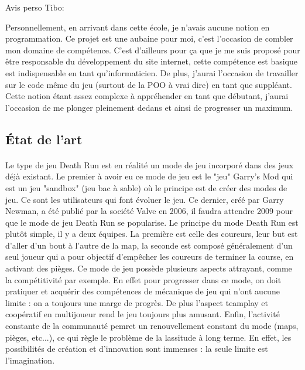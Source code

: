 \documentclass[12pt]{report}
\begin{document}
Avis perso Tibo:

Personnellement, en arrivant dans cette école, je n’avais aucune notion en programmation. Ce projet est une aubaine pour moi, c’est l’occasion de combler mon domaine de compétence. C’est d’ailleurs pour ça que je me suis proposé pour être responsable du développement du site internet, cette compétence est basique est indispensable en tant qu’informaticien. De plus, j’aurai l’occasion de travailler sur le code même du jeu (surtout de la POO à vrai dire) en tant que suppléant. Cette notion étant assez complexe à appréhender en tant que débutant, j’aurai l’occasion de me plonger pleinement dedans et ainsi de progresser un maximum. 

	\subsection{\'Etat de l'art}
	\paragraph{}
	Le type de jeu Death Run est en réalité un mode de jeu incorporé dans des jeux déjà existant. Le premier à avoir eu ce mode de jeu est le "jeu" Garry's Mod qui est un jeu "sandbox" (jeu bac à sable) où le principe est de créer des modes de jeu. Ce sont les utilisateurs qui font évoluer le jeu. Ce dernier, créé par Garry Newman, a été publié par la société Valve en 2006, il faudra attendre 2009 pour que le mode de jeu Death Run se popularise. Le principe du mode Death Run est plutôt simple, il y a deux équipes. La première est celle des coureurs, leur but est d'aller d'un bout à l'autre de la map, la seconde est composé généralement d'un seul joueur qui a pour objectif d'empêcher les coureurs de terminer la course, en activant des pièges. Ce mode de jeu possède plusieurs aspects attrayant, comme la compétitivité par exemple. En effet pour progresser dans ce mode, on doit pratiquer et acquérir des compétences de mécanique de jeu qui n'ont aucune limite : on a toujours une marge de progrès. De plus l'aspect teamplay et coopératif en multijoueur rend le jeu toujours plus amusant. Enfin, l'activité constante de la communauté pemret un renouvellement constant du mode (maps, pièges, etc...), ce qui règle le problème de la lassitude à long terme. En effet, les possibilités de création et d'innovation sont immenses : la seule limite est l'imagination.
\end{document}
